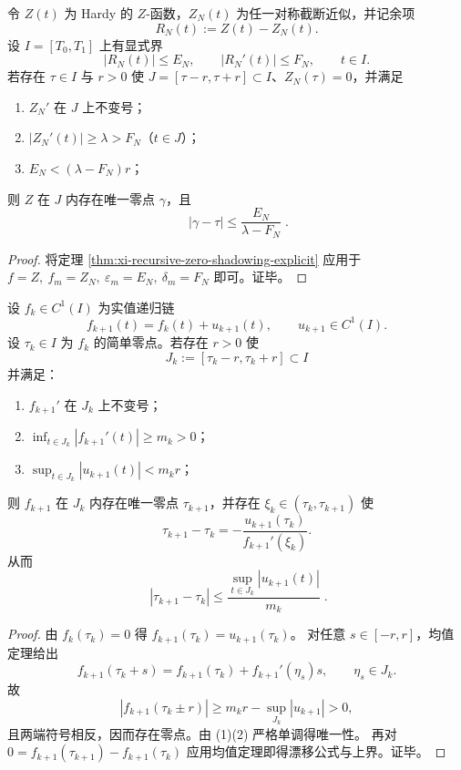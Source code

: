 \begin{corollary}[黎曼--西格尔型截断的局部零点认证闭合]\label{cor:xi-rs-local-zero-certification}
令 \(Z(t)\) 为 Hardy 的 \(Z\)-函数，\(Z_N(t)\) 为任一对称截断近似，并记余项
\[
R_N(t):=Z(t)-Z_N(t).
\]
设 \(I=[T_0,T_1]\) 上有显式界
\[
|R_N(t)|\le E_N,\qquad |R_N'(t)|\le F_N,\qquad t\in I.
\]
若存在 \(\tau\in I\) 与 \(r>0\) 使 \(J=[\tau-r,\tau+r]\subset I\)、\(Z_N(\tau)=0\)，并满足
\begin{enumerate}
  \item \(Z_N'\) 在 \(J\) 上不变号；
  \item \(|Z_N'(t)|\ge \lambda>F_N\)（\(t\in J\)）；
  \item \(E_N<(\lambda-F_N)r\)；
\end{enumerate}
则 \(Z\) 在 \(J\) 内存在唯一零点 \(\gamma\)，且
\[
\boxed{\;
|\gamma-\tau|\le \frac{E_N}{\lambda-F_N}\; }.
\]
\end{corollary}
\begin{proof}
将定理 \ref{thm:xi-recursive-zero-shadowing-explicit} 应用于
\(
f=Z,\ f_m=Z_N,\ \varepsilon_m=E_N,\ \delta_m=F_N
\)
即可。证毕。
\end{proof}

\begin{proposition}[分辨率递归的零点漂移公式与可计算上界]\label{prop:xi-resolution-recursion-zero-drift}
设 \(f_k\in C^1(I)\) 为实值递归链
\[
f_{k+1}(t)=f_k(t)+u_{k+1}(t),\qquad u_{k+1}\in C^1(I).
\]
设 \(\tau_k\in I\) 为 \(f_k\) 的简单零点。若存在 \(r>0\) 使
\[
J_k:=[\tau_k-r,\tau_k+r]\subset I
\]
并满足：
\begin{enumerate}
  \item \(f_{k+1}'\) 在 \(J_k\) 上不变号；
  \item \(\inf_{t\in J_k}|f_{k+1}'(t)|\ge m_k>0\)；
  \item \(\sup_{t\in J_k}|u_{k+1}(t)|<m_k r\)；
\end{enumerate}
则 \(f_{k+1}\) 在 \(J_k\) 内存在唯一零点 \(\tau_{k+1}\)，并存在
\(\xi_k\in(\tau_k,\tau_{k+1})\) 使
\[
\tau_{k+1}-\tau_k=-\frac{u_{k+1}(\tau_k)}{f_{k+1}'(\xi_k)}.
\]
从而
\[
\boxed{\;
|\tau_{k+1}-\tau_k|\le \frac{\sup_{t\in J_k}|u_{k+1}(t)|}{m_k}\; }.
\]
\end{proposition}
\begin{proof}
由 \(f_k(\tau_k)=0\) 得 \(f_{k+1}(\tau_k)=u_{k+1}(\tau_k)\)。
对任意 \(s\in[-r,r]\)，均值定理给出
\[
f_{k+1}(\tau_k+s)=f_{k+1}(\tau_k)+f_{k+1}'(\eta_s)s,\qquad \eta_s\in J_k.
\]
故
\[
|f_{k+1}(\tau_k\pm r)|
\ge m_k r-\sup_{J_k}|u_{k+1}|>0,
\]
且两端符号相反，因而存在零点。由 (1)(2) 严格单调得唯一性。
再对
\(
0=f_{k+1}(\tau_{k+1})-f_{k+1}(\tau_k)
\)
应用均值定理即得漂移公式与上界。证毕。
\end{proof}

